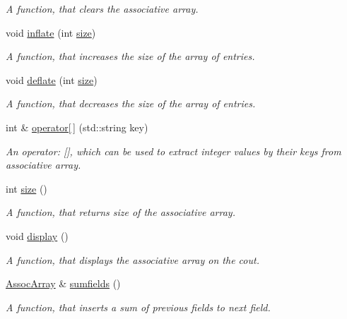 \begin{DoxyCompactItemize}
\begin{DoxyCompactList}\small\item\em A function, that clears the associative array. \end{DoxyCompactList}\item 
void \hyperlink{class_assoc_array_a074a811629c29414dfb172f8ed4273e6}{inflate} (int \hyperlink{class_assoc_array_af41e83fc4ee21d2b795c9eab765f45e0}{size})
\begin{DoxyCompactList}\small\item\em A function, that increases the size of the array of entries. \end{DoxyCompactList}\item 
void \hyperlink{class_assoc_array_a0d0c725df30b35a2e05c3cdc2ce2eccb}{deflate} (int \hyperlink{class_assoc_array_af41e83fc4ee21d2b795c9eab765f45e0}{size})
\begin{DoxyCompactList}\small\item\em A function, that decreases the size of the array of entries. \end{DoxyCompactList}\item 
int \& \hyperlink{class_assoc_array_a707ed0e095cc7d9c80d3619c6c693da3}{operator\mbox{[}$\,$\mbox{]}} (std\-::string key)
\begin{DoxyCompactList}\small\item\em An operator\-: \mbox{[}\mbox{]}, which can be used to extract integer values by their keys from associative array. \end{DoxyCompactList}\item 
int \hyperlink{class_assoc_array_af41e83fc4ee21d2b795c9eab765f45e0}{size} ()
\begin{DoxyCompactList}\small\item\em A function, that returns size of the associative array. \end{DoxyCompactList}\item 
\hypertarget{class_assoc_array_a64800d2ae59a4a305eb9062a48429a09}{void \hyperlink{class_assoc_array_a64800d2ae59a4a305eb9062a48429a09}{display} ()}\label{class_assoc_array_a64800d2ae59a4a305eb9062a48429a09}

\begin{DoxyCompactList}\small\item\em A function, that displays the associative array on the cout. \end{DoxyCompactList}\item 
\hypertarget{class_assoc_array_adf597a541bba1c068a900ad82fefc093}{\hyperlink{class_assoc_array}{Assoc\-Array} \& \hyperlink{class_assoc_array_adf597a541bba1c068a900ad82fefc093}{sumfields} ()}\label{class_assoc_array_adf597a541bba1c068a900ad82fefc093}

\begin{DoxyCompactList}\small\item\em A function, that inserts a sum of previous fields to next field. \end{DoxyCompactList}\end{DoxyCompactItemize}


